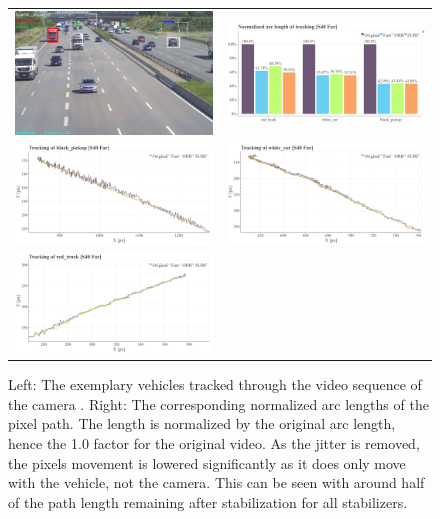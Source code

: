 \begin{figure}[!ht]
  \centering
  \begin{tabular}{cc}
    \includegraphics[width=0.45\linewidth]{diagrams/object_tracking/s40_n_far/frame.png}    &  
    \includegraphics[width=0.475\linewidth]{diagrams/object_tracking/s40_n_far/arcs.png}    \\

    \includegraphics[width=0.475\linewidth]{diagrams/object_tracking/s40_n_far/black_pickup.png}    &  
    \includegraphics[width=0.475\linewidth]{diagrams/object_tracking/s40_n_far/white_car.png}    \\  
    \includegraphics[width=0.475\linewidth]{diagrams/object_tracking/s40_n_far/red_truck.png}   
  \end{tabular}
  \caption{Left: 
  The exemplary vehicles tracked through the video sequence of the camera . 
  Right:
  The corresponding normalized arc lengths of the pixel path. 
  The length is normalized by the original arc length, hence the 1.0 factor for the original video. 
  As the jitter is removed, the pixels movement is lowered significantly as it does only move with the vehicle, not the camera.
  This can be seen with around half of the path length remaining after stabilization for all stabilizers.
  }
  \label{fig:object_tracking_appendix_s40_n_far}
\end{figure}



